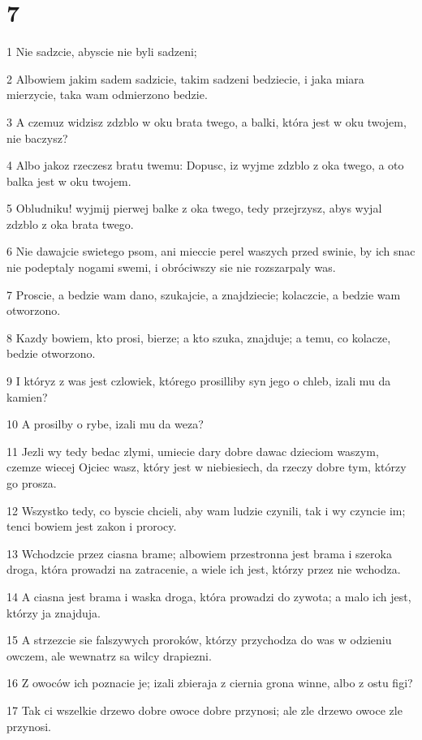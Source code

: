 \chapter{7}

\par 1 Nie sadzcie, abyscie nie byli sadzeni;
\par 2 Albowiem jakim sadem sadzicie, takim sadzeni bedziecie, i jaka miara mierzycie, taka wam odmierzono bedzie.
\par 3 A czemuz widzisz zdzblo w oku brata twego, a balki, która jest w oku twojem, nie baczysz?
\par 4 Albo jakoz rzeczesz bratu twemu: Dopusc, iz wyjme zdzblo z oka twego, a oto balka jest w oku twojem.
\par 5 Obludniku! wyjmij pierwej balke z oka twego, tedy przejrzysz, abys wyjal zdzblo z oka brata twego.
\par 6 Nie dawajcie swietego psom, ani mieccie perel waszych przed swinie, by ich snac nie podeptaly nogami swemi, i obróciwszy sie nie rozszarpaly was.
\par 7 Proscie, a bedzie wam dano, szukajcie, a znajdziecie; kolaczcie, a bedzie wam otworzono.
\par 8 Kazdy bowiem, kto prosi, bierze; a kto szuka, znajduje; a temu, co kolacze, bedzie otworzono.
\par 9 I któryz z was jest czlowiek, którego prosilliby syn jego o chleb, izali mu da kamien?
\par 10 A prosilby o rybe, izali mu da weza?
\par 11 Jezli wy tedy bedac zlymi, umiecie dary dobre dawac dzieciom waszym, czemze wiecej Ojciec wasz, który jest w niebiesiech, da rzeczy dobre tym, którzy go prosza.
\par 12 Wszystko tedy, co byscie chcieli, aby wam ludzie czynili, tak i wy czyncie im; tenci bowiem jest zakon i prorocy.
\par 13 Wchodzcie przez ciasna brame; albowiem przestronna jest brama i szeroka droga, która prowadzi na zatracenie, a wiele ich jest, którzy przez nie wchodza.
\par 14 A ciasna jest brama i waska droga, która prowadzi do zywota; a malo ich jest, którzy ja znajduja.
\par 15 A strzezcie sie falszywych proroków, którzy przychodza do was w odzieniu owczem, ale wewnatrz sa wilcy drapiezni.
\par 16 Z owoców ich poznacie je; izali zbieraja z ciernia grona winne, albo z ostu figi?
\par 17 Tak ci wszelkie drzewo dobre owoce dobre przynosi; ale zle drzewo owoce zle przynosi.
